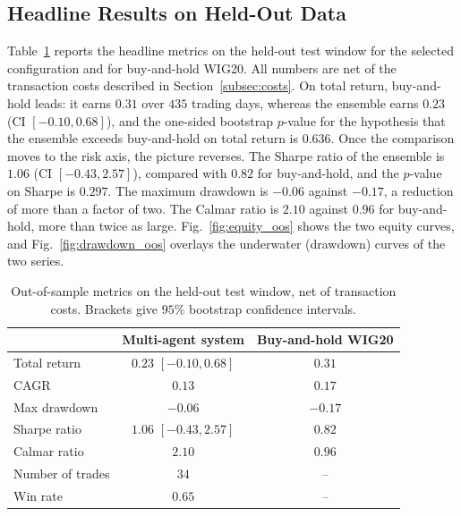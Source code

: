 \documentclass{ieeeaccess}
\newcommand{\TRtest}{\ensuremath{0.23}}
\newcommand{\TRtestCIlow}{\ensuremath{-0.10}}
\newcommand{\TRtestCIhigh}{\ensuremath{0.68}}
\newcommand{\Shtest}{\ensuremath{1.06}}
\newcommand{\ShtestCIlow}{\ensuremath{-0.43}}
\newcommand{\ShtestCIhigh}{\ensuremath{2.57}}
\newcommand{\MDDtest}{\ensuremath{-0.06}}
\newcommand{\Calmtest}{\ensuremath{2.10}}
\newcommand{\CAGRtest}{\ensuremath{0.13}}
\newcommand{\Ntrades}{\ensuremath{34}}
\newcommand{\WinRate}{\ensuremath{0.65}}
\newcommand{\BHtest}{\ensuremath{0.31}}
\newcommand{\BHsharpe}{\ensuremath{0.82}}
\newcommand{\MDDbh}{\ensuremath{-0.17}}
\newcommand{\CAGRbh}{\ensuremath{0.17}}
\newcommand{\Calmbh}{\ensuremath{0.96}}
\newcommand{\PvsBH}{\ensuremath{0.636}}
\newcommand{\PvsBHsharpe}{\ensuremath{0.297}}
\newcommand{\OOSDays}{\ensuremath{435}}
\begin{document}
\subsection{Headline Results on Held-Out Data}
\label{subsec:headline}

Table~\ref{tab:headline} reports the headline metrics on the held-out test window for the selected configuration and for buy-and-hold WIG20. All numbers are net of the transaction costs described in Section~\ref{subsec:costs}. On total return, buy-and-hold leads: it earns \BHtest{} over \OOSDays{} trading days, whereas the ensemble earns \TRtest{} (CI $[\TRtestCIlow, \TRtestCIhigh]$), and the one-sided bootstrap $p$-value for the hypothesis that the ensemble exceeds buy-and-hold on total return is \PvsBH{}. Once the comparison moves to the risk axis, the picture reverses. The Sharpe ratio of the ensemble is \Shtest{} (CI $[\ShtestCIlow, \ShtestCIhigh]$), compared with \BHsharpe{} for buy-and-hold, and the $p$-value on Sharpe is \PvsBHsharpe{}. The maximum drawdown is \MDDtest{} against \MDDbh{}, a reduction of more than a factor of two. The Calmar ratio is \Calmtest{} against \Calmbh{} for buy-and-hold, more than twice as large. Fig.~\ref{fig:equity_oos} shows the two equity curves, and Fig.~\ref{fig:drawdown_oos} overlays the underwater (drawdown) curves of the two series.

\begin{table}[t]
\centering
\caption{Out-of-sample metrics on the held-out test window, net of transaction costs. Brackets give $95\%$ bootstrap confidence intervals.}
\label{tab:headline}
\begin{tabular}{lcc}
\toprule
 & Multi-agent system & Buy-and-hold WIG20 \\
\midrule
Total return     & $\TRtest$ $[\TRtestCIlow, \TRtestCIhigh]$ & $\BHtest$ \\
CAGR             & $\CAGRtest$ & $\CAGRbh$ \\
Max drawdown     & $\MDDtest$  & $\MDDbh$ \\
Sharpe ratio     & $\Shtest$ $[\ShtestCIlow, \ShtestCIhigh]$ & $\BHsharpe$ \\
Calmar ratio     & $\Calmtest$ & $\Calmbh$ \\
Number of trades & $\Ntrades$  & -- \\
Win rate         & $\WinRate$  & -- \\
\bottomrule
\end{tabular}
\end{table}
\end{document}
